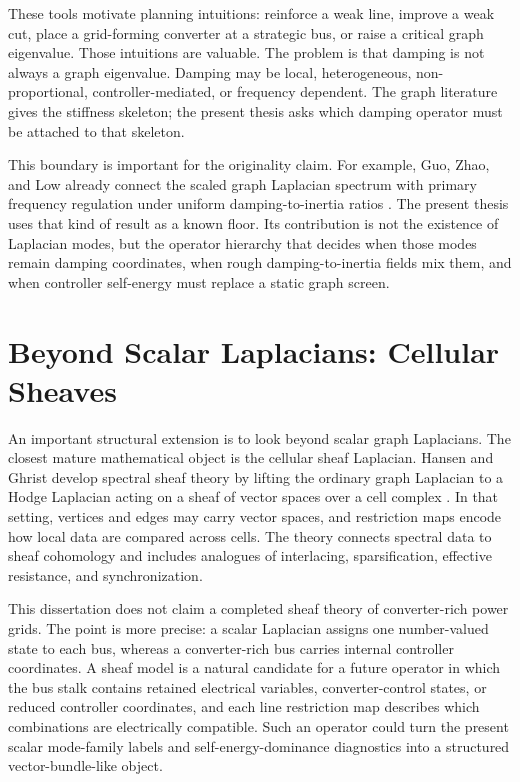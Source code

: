 These tools motivate planning intuitions: reinforce a weak line, improve a
weak cut, place a grid-forming converter at a strategic bus, or raise a
critical graph eigenvalue. Those intuitions are valuable. The problem is that
damping is not always a graph eigenvalue. Damping may be local, heterogeneous,
non-proportional, controller-mediated, or frequency dependent. The graph
literature gives the stiffness skeleton; the present thesis asks which damping
operator must be attached to that skeleton.

This boundary is important for the originality claim. For example, Guo, Zhao,
and Low already connect the scaled graph Laplacian spectrum with primary
frequency regulation under uniform damping-to-inertia ratios
\cite{guo2018graph}. The present thesis uses that kind of result as a known
floor. Its contribution is not the existence of Laplacian modes, but the
operator hierarchy that decides when those modes remain damping coordinates,
when rough damping-to-inertia fields mix them, and when controller self-energy
must replace a static graph screen.

\section{Beyond Scalar Laplacians: Cellular Sheaves}

An important structural extension is to look beyond scalar graph
Laplacians. The closest mature mathematical object is the cellular sheaf
Laplacian. Hansen and Ghrist develop spectral sheaf theory by lifting the
ordinary graph Laplacian to a Hodge Laplacian acting on a sheaf of vector
spaces over a cell complex \cite{hansen2019sheaf}. In that setting, vertices
and edges may carry vector spaces, and restriction maps encode how local data
are compared across cells. The theory connects spectral data to sheaf
cohomology and includes analogues of interlacing, sparsification, effective
resistance, and synchronization.

This dissertation does not claim a completed sheaf theory of converter-rich
power grids. The point is more precise: a scalar Laplacian assigns one
number-valued state to each bus, whereas a converter-rich bus carries internal
controller coordinates. A sheaf model is a natural candidate for a future
operator in which the bus stalk contains retained electrical variables,
converter-control states, or reduced controller coordinates, and each line
restriction map describes which combinations are electrically compatible. Such
an operator could turn the present scalar mode-family labels and
self-energy-dominance diagnostics into a structured vector-bundle-like object.

